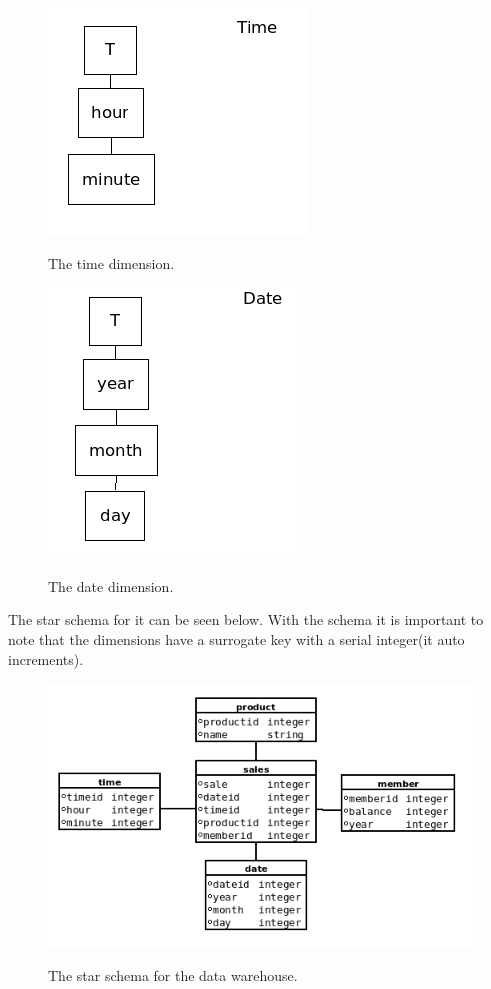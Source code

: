 	\begin{minipage}{0.45\textwidth}
	\begin{figure}[H]
	\centering
	\includegraphics[scale=0.5]{dimensionTime}
	\label{image:time}
	\caption{The time dimension.}
	\end{figure}
	\end{minipage}
	\begin{minipage}{0.45\textwidth}
	\begin{figure}[H]
	\centering
	\includegraphics[scale=0.5]{dimensionDate}
	\label{image:date}
	\caption{The date dimension.}
	\end{figure}
	\end{minipage}
	
	The star schema for it can be seen below.  With the schema it is important to note that the dimensions have a surrogate key with a serial integer(it auto increments).
	
	
	\begin{figure}[H]
	\centering
	\includegraphics[scale=0.75]{star-scheme}
	\label{image:starschema}
	\caption{The star schema for the data warehouse.}
	\end{figure}
		
	


